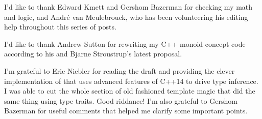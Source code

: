 \noindent
I’d like to thank Edward Kmett and Gershom Bazerman for checking my math
and logic, and André van Meulebrouck, who has been volunteering his editing
help throughout this series of posts.

\vspace{1.0em}
\noindent
I’d like to thank Andrew Sutton for rewriting my C++ monoid concept
code according to his and Bjarne Stroustrup’s latest proposal.

\vspace{1.0em}
\noindent
I'm grateful to Eric Niebler for reading the draft and providing the
clever implementation of  that uses advanced features of
C++14 to drive type inference. I was able to cut the whole section of
old fashioned template magic that did the same thing using type traits.
Good riddance! I'm also grateful to Gershom Bazerman for useful comments
that helped me clarify some important points.